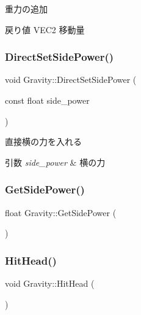 重力の追加 

\begin{DoxyReturn}{戻り値}
V\+E\+C2 移動量 
\end{DoxyReturn}
\mbox{\label{class_gravity_a015bda4dc0019baaa70378e1d6715a55}} 
\subsubsection{\texorpdfstring{Direct\+Set\+Side\+Power()}{DirectSetSidePower()}}
{\footnotesize\ttfamily void Gravity\+::\+Direct\+Set\+Side\+Power (\begin{DoxyParamCaption}\item[{const float}]{side\+\_\+power }\end{DoxyParamCaption})\hspace{0.3cm}{\ttfamily [inline]}}



直接横の力を入れる 


\begin{DoxyParams}{引数}
{\em side\+\_\+power} & 横の力 \\
\hline
\end{DoxyParams}
\mbox{\label{class_gravity_a32728f5db170dedc5a2a5282c7ec1a78}} 
\subsubsection{\texorpdfstring{Get\+Side\+Power()}{GetSidePower()}}
{\footnotesize\ttfamily float Gravity\+::\+Get\+Side\+Power (\begin{DoxyParamCaption}{ }\end{DoxyParamCaption})\hspace{0.3cm}{\ttfamily [inline]}}

\mbox{\label{class_gravity_a56fa68b18b0426bdb267850e1917eb05}} 
\subsubsection{\texorpdfstring{Hit\+Head()}{HitHead()}}
{\footnotesize\ttfamily void Gravity\+::\+Hit\+Head (\begin{DoxyParamCaption}{ }\end{DoxyParamCaption})\hspace{0.3cm}{\ttfamily [inline]}}



